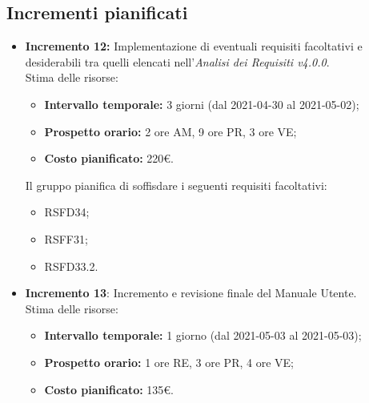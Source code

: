 \subsection{Incrementi pianificati}
\begin{itemize}
	\item \textbf{Incremento 12:}
	Implementazione di eventuali requisiti facoltativi e desiderabili tra quelli elencati nell'\textit{Analisi dei Requisiti v4.0.0}. \\
	Stima delle risorse:
  \begin{itemize}
		\item \textbf{Intervallo temporale:} 3 giorni (dal 2021-04-30 al 2021-05-02);
		\item \textbf{Prospetto orario:} 2 ore AM, 9 ore PR, 3 ore VE;
		\item \textbf{Costo pianificato:} 220\euro.
	\end{itemize}
	Il gruppo pianifica di soffisdare i seguenti requisiti facoltativi:
		\begin{itemize}
			\item RSFD34;
			\item RSFF31;
			\item RSFD33.2.
		\end{itemize}

	\item \textbf{Incremento 13}:
	Incremento e revisione finale del Manuale Utente.\\
	Stima delle risorse:
  \begin{itemize}
		\item \textbf{Intervallo temporale:} 1 giorno (dal 2021-05-03 al 2021-05-03);
		\item \textbf{Prospetto orario:} 1 ore RE, 3 ore PR, 4 ore VE;
		\item \textbf{Costo pianificato:} 135\euro.
	\end{itemize}


\end{itemize}
